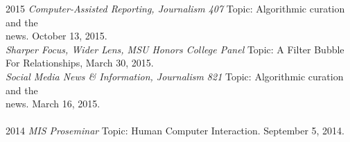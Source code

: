 \documentclass[9pt]{extarticle}
\begin{document}
\begin{tabbing}
2015 \hspace{0.3in}\=  \emph{Computer-Assisted Reporting, Journalism 407} Topic: Algorithmic curation and the \\
\> \hspace{0.5cm} news. October 13, 2015. \\
\> \emph{Sharper Focus, Wider Lens, MSU Honors College Panel} Topic: A Filter Bubble \\
\> \hspace{0.5cm} For Relationships, March 30, 2015.\\
\> \emph{Social Media News \& Information, Journalism 821} Topic: Algorithmic curation and the \\
\> \hspace{0.5cm} news. March 16, 2015. \\\\

2014 \hspace{0.3in}\=  \emph{MIS Proseminar} Topic: Human Computer Interaction. September 5, 2014.\\\\
\end{tabbing}

\newpage
\end{document}
